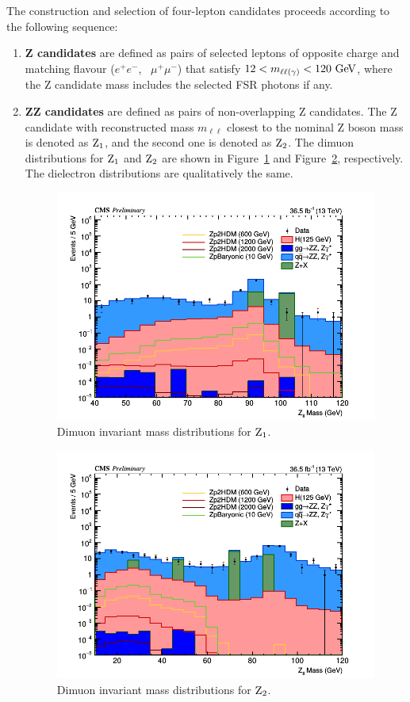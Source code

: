 The construction and selection of four-lepton candidates proceeds 
according to the following sequence:
\begin{enumerate}
\item {\bf Z candidates} are defined as pairs of selected leptons
 of opposite charge and matching flavour ($e^+ e^-$, \, $\mu^+\mu^-$)
 that satisfy $12 < m_{\ell\ell(\gamma)} < 120~\mathrm{Ge\kern -0.1em V}$, where the Z candidate mass
 includes the selected FSR photons if any.
\item {\bf ZZ candidates} are defined as pairs of non-overlapping Z candidates.
 The Z candidate with reconstructed mass $m_{\ell\ell}$ closest to the nominal Z boson
 mass is denoted as ${\rm Z_1}$, and the second one is denoted as ${\rm Z_2}$. The dimuon distributions for ${\rm Z_1}$ and ${\rm Z_2}$ are shown in Figure~\ref{fig:dimuonz1} and Figure~\ref{fig:dimuonz2}, respectively. The dielectron distributions are qualitatively the same.

\begin{figure}[tbh]
\centering
\includegraphics[width=5in]{figures/hist_hMZ1_8.png}
    \caption{Dimuon invariant mass distributions for ${\rm Z_1}$.}
    \label{fig:dimuonz1}
\end{figure}

\begin{figure}[tbh]
\centering
\includegraphics[width=5in]{figures/hist_hMZ2_8.png}
    \caption{Dimuon invariant mass distributions for ${\rm Z_2}$.}
    \label{fig:dimuonz2}
\end{figure}


\end{enumerate}
